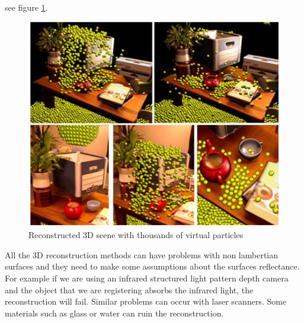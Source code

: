  see figure \ref{fig:izadi}.

\begin{figure}[h!]
\begin{center}
\includegraphics[scale=0.34]{images/izadi}
\caption{Reconstructed 3D scene with thousands of virtual particles}
\label{fig:izadi}
\end{center}
\end{figure}


All the 3D reconstruction methods can have problems with non lambertian 
surfaces and they need to make some assumptions about the surfaces reflectance. For example if we are using 
an infrared structured light pattern depth camera and the object that we are registering absorbs the infrared light, 
the reconstruction will fail. Similar problems can occur with laser scanners. 
Some materials such as glass or water can ruin the reconstruction.
